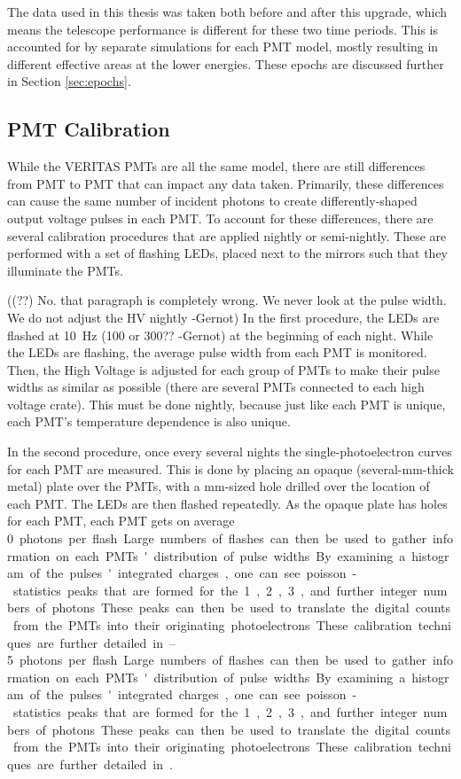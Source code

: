The data used in this thesis was taken both before and after this upgrade, which means the telescope performance is different for these two time periods.
This is accounted for by separate simulations for each PMT model, mostly resulting in different effective areas at the lower energies.
These epochs are discussed further in Section \ref{sec:epochs}.


\subsection{PMT Calibration}

While the VERITAS PMTs are all the same model, there are still differences from PMT to PMT that can impact any data taken.
Primarily, these differences can cause the same number of incident photons to create differently-shaped output voltage pulses in each PMT.
To account for these differences, there are several calibration procedures that are applied nightly or semi-nightly.
These are performed with a set of flashing LEDs, placed next to the mirrors such that they illuminate the PMTs.

{\color{red}((??) No. that paragraph is completely wrong. We never look at the pulse width. We do not adjust the HV nightly -Gernot)}
In the first procedure, the LEDs are flashed at \nicetilde{}\SI{10}{Hz} {\color{red}(100 or 300?? -Gernot)} at the beginning of each night.
While the LEDs are flashing, the average pulse width from each PMT is monitored.
Then, the High Voltage is adjusted for each group of PMTs to make their pulse widths as similar as possible (there are several PMTs connected to each high voltage crate).
This must be done nightly, because just like each PMT is unique, each PMT's temperature dependence is also unique.

In the second procedure, once every several nights the single-photoelectron curves for each PMT are measured.
This is done by placing an opaque (several-mm-thick metal) plate over the PMTs, with a mm-sized hole drilled over the location of each PMT.
The LEDs are then flashed repeatedly.
As the opaque plate has holes for each PMT, each PMT gets on average \SIrange{0}{5} photons per flash.
Large numbers of flashes can then be used to gather information on each PMTs' distribution of pulse widths.
By examining a histogram of the pulses' integrated charges, one can see poisson-statistics peaks that are formed for the 1, 2, 3, and further integer numbers of photons.
These peaks can then be used to translate the digital counts from the PMTs into their originating photoelectrons.
These calibration techniques are further detailed in \cite{calib_techniques}.


